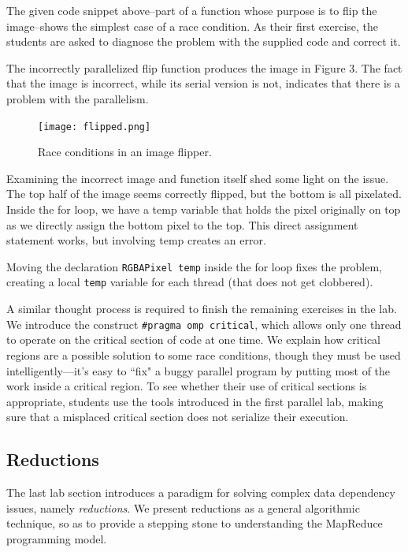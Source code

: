 \documentclass[conference]{./IEEEtran}
\begin{document}
The given code snippet above--part of a function whose purpose is to flip the
image--shows the simplest case of a race condition. As their first exercise, the
students are asked to diagnose the problem with the supplied code and correct
it.

The incorrectly parallelized flip function produces the image in Figure 3.  The
fact that the image is incorrect, while its serial version is not, indicates
that there is a problem with the parallelism. 

\begin{figure}[here]
\label{fig:flipped}
\begin{center}
\texttt{[image: flipped.png]}
\caption{Race conditions in an image flipper.}
\end{center}
\end{figure}

Examining the incorrect image and function itself shed some light on the issue.
The top half of the image seems correctly flipped, but the bottom is all
pixelated. Inside the for loop, we have a temp variable that holds the pixel
originally on top as we directly assign the bottom pixel to the top.  This
direct assignment statement works, but involving temp creates an error.

Moving the declaration \verb|RGBAPixel temp| inside the for loop fixes
the problem, creating a local \verb|temp| variable for each thread (that
does not get clobbered).

A similar thought process is required to finish the remaining exercises in the
lab. We introduce the construct \verb|#pragma omp critical|, which allows only
one thread to operate on the critical section of code at one time. We explain
how critical regions are a possible solution to some race conditions, though
they must be used intelligently---it's easy to ``fix" a buggy parallel program
by putting most of the work inside a critical region. To see whether their use
of critical sections is appropriate, students use the tools introduced in the
first parallel lab, making sure that a misplaced critical section does not
serialize their execution.

\subsection{Reductions}

The last lab section introduces a paradigm for solving complex data dependency
issues, namely {\em reductions}.  We present reductions as a general algorithmic
technique, so as to  provide a stepping stone to understanding the MapReduce
programming model.
\end{document}
